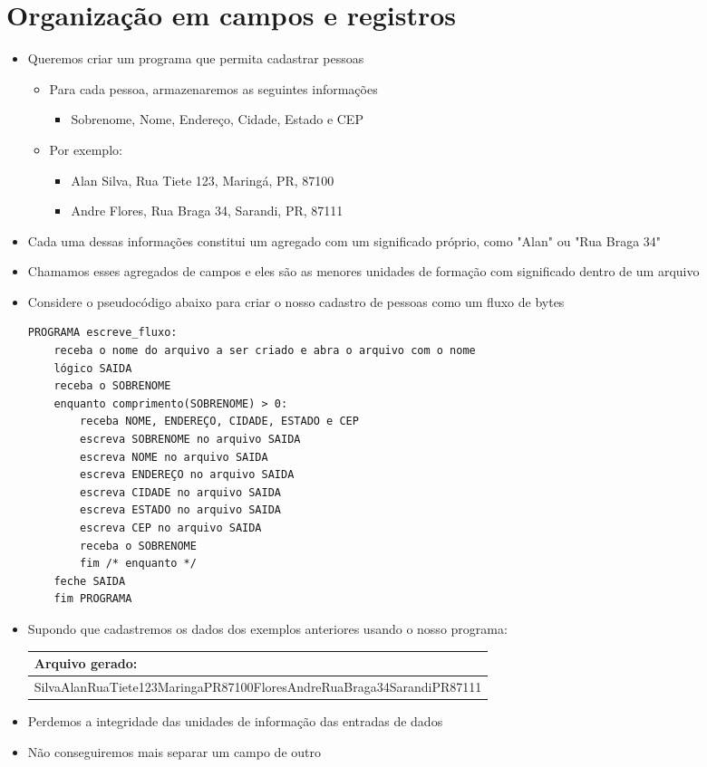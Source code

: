 \documentclass[12pt]{article}
\begin{document}
\section{Organização em campos e registros}
\begin{itemize}
    \item Queremos criar um programa que permita cadastrar pessoas
    \begin{itemize}
        \item Para cada pessoa, armazenaremos as seguintes informações
        \begin{itemize}
            \item Sobrenome, Nome, Endereço, Cidade, Estado e CEP
        \end{itemize}
        \item Por exemplo:
        \begin{itemize}
            \item Alan Silva, Rua Tiete 123, Maringá, PR, 87100
            \item Andre Flores, Rua Braga 34, Sarandi, PR, 87111
        \end{itemize}
    \end{itemize}
    \item Cada uma dessas informações constitui um agregado com um significado 
    próprio, como "Alan" ou "Rua Braga 34"
    \item Chamamos esses agregados de campos e eles são as menores unidades de 
    formação com significado dentro de um arquivo
    \item Considere o pseudocódigo abaixo para criar o nosso cadastro de pessoas 
    como um fluxo de bytes
    \vspace{20pt}
    \begin{verbatim}
PROGRAMA escreve_fluxo:
    receba o nome do arquivo a ser criado e abra o arquivo com o nome 
    lógico SAIDA
    receba o SOBRENOME
    enquanto comprimento(SOBRENOME) > 0:
        receba NOME, ENDEREÇO, CIDADE, ESTADO e CEP
        escreva SOBRENOME no arquivo SAIDA
        escreva NOME no arquivo SAIDA
        escreva ENDEREÇO no arquivo SAIDA
        escreva CIDADE no arquivo SAIDA
        escreva ESTADO no arquivo SAIDA
        escreva CEP no arquivo SAIDA
        receba o SOBRENOME
        fim /* enquanto */
    feche SAIDA
    fim PROGRAMA
    \end{verbatim}
    \item Supondo que cadastremos os dados dos exemplos anteriores usando o 
    nosso programa:
    \begin{table}[H]
        \centering
        \begin{tabular}{|l|}
            \hline
            Arquivo gerado: \\\hline
            SilvaAlanRuaTiete123MaringaPR87100FloresAndreRuaBraga34SarandiPR87111
            \\\hline
        \end{tabular}
    \end{table}
    \item Perdemos a integridade das unidades de informação das entradas de dados
    \item Não conseguiremos mais separar um campo de outro
\end{itemize}
\end{document}
